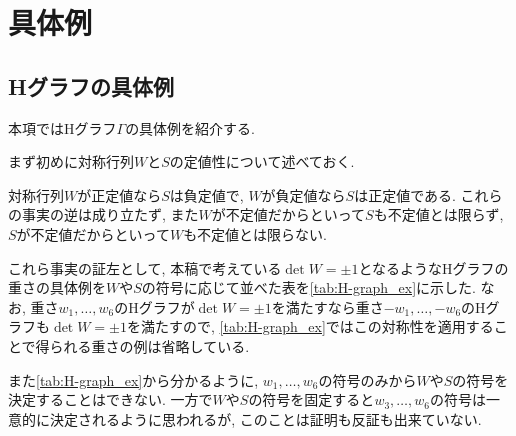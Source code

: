 \documentclass[11pt,b5paper,oneside,lualatex]{ltjsarticle} %
\numberwithin{equation}{section} %
\begin{document}

\section{具体例} \label{sec:examples}




\subsection{Hグラフの具体例} \label{subsec:H-graph_ex}


本項ではHグラフ$ \Gamma $の具体例を紹介する. 

まず初めに対称行列$ W $と$ S $の定値性について述べておく. 

\begin{rem}
	対称行列$ W $が正定値なら$ S $は負定値で, $ W $が負定値なら$ S $は正定値である. 
	これらの事実の逆は成り立たず, また$ W $が不定値だからといって$ S $も不定値とは限らず, $ S $が不定値だからといって$ W $も不定値とは限らない. 
	
	これら事実の証左として, 本稿で考えている$ \det W = \pm 1 $となるようなHグラフの重さの具体例を$ W $や$ S $の符号に応じて並べた表を\cref{tab:H-graph_ex}に示した. 
	なお, 重さ$ w_1, \dots, w_6 $のHグラフが$ \det W = \pm 1 $を満たすなら重さ$ -w_1, \dots, -w_6 $のHグラフも$ \det W = \pm 1 $を満たすので, \cref{tab:H-graph_ex}ではこの対称性を適用することで得られる重さの例は省略している. 
	
	また\cref{tab:H-graph_ex}から分かるように, $ w_1, \dots, w_6 $の符号のみから$ W $や$ S $の符号を決定することはできない. 
	一方で$ W $や$ S $の符号を固定すると$ w_3, \dots, w_6 $の符号は一意的に決定されるように思われるが, このことは証明も反証も出来ていない. 
\end{rem}
\end{document}
